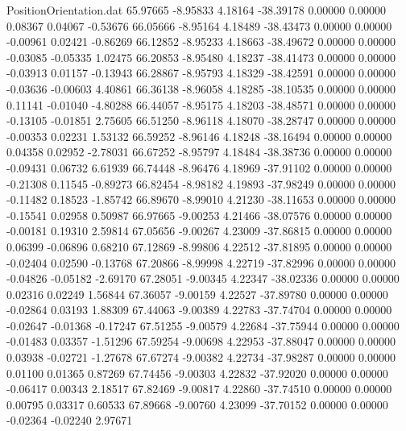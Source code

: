 \begin{filecontents}{PositionOrientation.dat}
  65.97665   -8.95833    4.18164   -38.39178    0.00000    0.00000    0.08367    0.04067   -0.53676
  66.05666   -8.95164    4.18489   -38.43473    0.00000    0.00000   -0.00961    0.02421   -0.86269
  66.12852   -8.95233    4.18663   -38.49672    0.00000    0.00000   -0.03085   -0.05335    1.02475
  66.20853   -8.95480    4.18237   -38.41473    0.00000    0.00000   -0.03913    0.01157   -0.13943
  66.28867   -8.95793    4.18329   -38.42591    0.00000    0.00000   -0.03636   -0.00603    4.40861
  66.36138   -8.96058    4.18285   -38.10535    0.00000    0.00000    0.11141   -0.01040   -4.80288
  66.44057   -8.95175    4.18203   -38.48571    0.00000    0.00000   -0.13105   -0.01851    2.75605
  66.51250   -8.96118    4.18070   -38.28747    0.00000    0.00000   -0.00353    0.02231    1.53132
  66.59252   -8.96146    4.18248   -38.16494    0.00000    0.00000    0.04358    0.02952   -2.78031
  66.67252   -8.95797    4.18484   -38.38736    0.00000    0.00000   -0.09431    0.06732    6.61939
  66.74448   -8.96476    4.18969   -37.91102    0.00000    0.00000   -0.21308    0.11545   -0.89273
  66.82454   -8.98182    4.19893   -37.98249    0.00000    0.00000   -0.11482    0.18523   -1.85742
  66.89670   -8.99010    4.21230   -38.11653    0.00000    0.00000   -0.15541    0.02958    0.50987
  66.97665   -9.00253    4.21466   -38.07576    0.00000    0.00000   -0.00181    0.19310    2.59814
  67.05656   -9.00267    4.23009   -37.86815    0.00000    0.00000    0.06399   -0.06896    0.68210
  67.12869   -8.99806    4.22512   -37.81895    0.00000    0.00000   -0.02404    0.02590   -0.13768
  67.20866   -8.99998    4.22719   -37.82996    0.00000    0.00000   -0.04826   -0.05182   -2.69170
  67.28051   -9.00345    4.22347   -38.02336    0.00000    0.00000    0.02316    0.02249    1.56844
  67.36057   -9.00159    4.22527   -37.89780    0.00000    0.00000   -0.02864    0.03193    1.88309
  67.44063   -9.00389    4.22783   -37.74704    0.00000    0.00000   -0.02647   -0.01368   -0.17247
  67.51255   -9.00579    4.22684   -37.75944    0.00000    0.00000   -0.01483    0.03357   -1.51296
  67.59254   -9.00698    4.22953   -37.88047    0.00000    0.00000    0.03938   -0.02721   -1.27678
  67.67274   -9.00382    4.22734   -37.98287    0.00000    0.00000    0.01100    0.01365    0.87269
  67.74456   -9.00303    4.22832   -37.92020    0.00000    0.00000   -0.06417    0.00343    2.18517
  67.82469   -9.00817    4.22860   -37.74510    0.00000    0.00000    0.00795    0.03317    0.60533
  67.89668   -9.00760    4.23099   -37.70152    0.00000    0.00000   -0.02364   -0.02240    2.97671

\end{filecontents}
